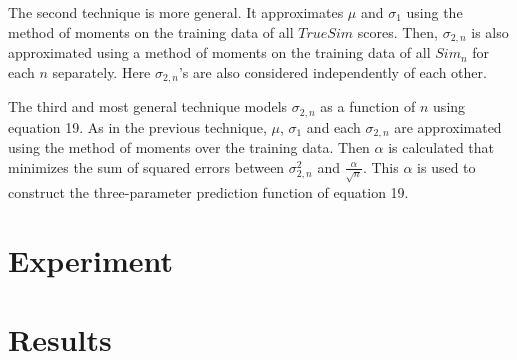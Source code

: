 \documentclass[11pt]{article}
\begin{document}
The second technique is more general. It approximates $\mu$ and $\sigma_{1}$
using the method of moments on the training data of all $TrueSim$ scores. Then,
$\sigma_{2,n}$ is also approximated using a method of moments on the training
data of all $Sim_n$ for each $n$ separately. Here $\sigma_{2,n}$'s are also
considered independently of each other.

The third and most general technique models $\sigma_{2,n}$ as a function of
$n$ using equation 19. As in the previous technique, $\mu$, $\sigma_{1}$ and each
$\sigma_{2,n}$ are approximated using the method of moments over the training
data. Then $\alpha$ is calculated that minimizes the sum of squared errors
between $\sigma_{2,n}^2$ and $\frac{\alpha}{\sqrt{n}}$. This $\alpha$ is used to
construct the three-parameter prediction function of equation 19.

\section*{Experiment}

\section*{Results}
\end{document}
